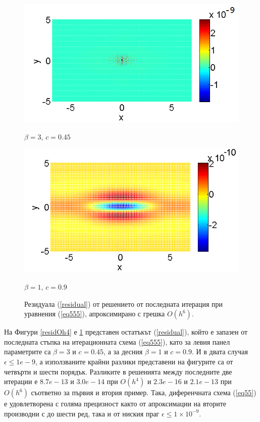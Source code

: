 \documentclass{article}
\newcommand{\rf}[1]{(\ref{#1})}
\theoremstyle{remark}
\begin{document}
\begin{figure}[ht]
	\begin{minipage}[b]{0.45\linewidth}
		\raggedleft
		\includegraphics[width=\linewidth]{residual/residual_bt3c045_Oh6.png}
		\centerline{$\beta = 3$, $c = 0.45$}	
	\end{minipage}	
	\begin{minipage}[b]{0.41625\linewidth}	
		 \includegraphics[width=\linewidth]{residual/residual_bt1c090_Oh6.png}
		\centerline{$\beta = 1$, $c = 0.9$ }
	\end{minipage}

	\caption{Резидуала \rf{residual} от решението от последната итерация при уравнения \rf{eq555}, апроксимирано с грешка  $O(h^6)$. }
	\label{residOh6}
\end{figure}
\FloatBarrier
На Фигури \ref{residOh4} е \ref{residOh6} представен остатъкът \rf{residual}, който е запазен от последната стъпка на итерационната схема \rf{eq555}, като за левия панел  параметрите са $\beta = 3$ и $c = 0.45$, а за десния $\beta = 1$ и $c = 0.9$. И в двата случая $\epsilon \le 1e-9$, а използваните крайни разлики представени на фигурите са от четвърти и шести порядък. Разликите в решенията между последните две итерации е $8.7e-13$ и $3.0e-14$ при $O(h^4)$ и $2.3e-16$ и $2.1e-13$ при $O(h^6)$ съответно за първия и втория пример. Така, диференчната схема \rf{eq55} е удовлетворена с голяма прецизност както от апроксимации на вторите производни с до шести ред, така и от ниския праг $\epsilon \le 1\times10^{-9}$. 
\end{document}
